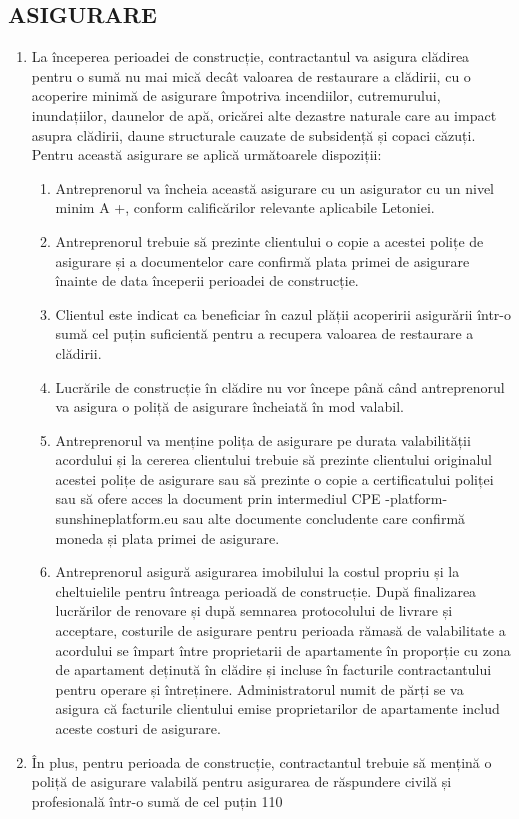 \begin{multicols}{2}
\subsection{ASIGURARE}
\begin{enumerate}
\item La începerea perioadei de construcție, contractantul va asigura clădirea pentru o sumă nu mai mică decât valoarea de restaurare a clădirii, cu o acoperire minimă de asigurare împotriva incendiilor, cutremurului, inundațiilor, daunelor de apă, oricărei alte dezastre naturale care au impact asupra clădirii, daune structurale cauzate de subsidență și copaci căzuți. Pentru această asigurare se aplică următoarele dispoziții:
  \begin{enumerate}
\item Antreprenorul va încheia această asigurare cu un asigurator cu un nivel minim A +, conform calificărilor relevante aplicabile Letoniei.
\item Antreprenorul trebuie să prezinte clientului o copie a acestei polițe de asigurare și a documentelor care confirmă plata primei de asigurare înainte de data începerii perioadei de construcție.
\item Clientul este indicat ca beneficiar în cazul plății acoperirii asigurării într-o sumă cel puțin suficientă pentru a recupera valoarea de restaurare a clădirii.
\item Lucrările de construcție în clădire nu vor începe până când antreprenorul va asigura o poliță de asigurare încheiată în mod valabil.
\item Antreprenorul va menține polița de asigurare pe durata valabilității acordului și la cererea clientului trebuie să prezinte clientului originalul acestei polițe de asigurare sau să prezinte o copie a certificatului poliței sau să ofere acces la document prin intermediul CPE -platform-sunshineplatform.eu sau alte documente concludente care confirmă moneda și plata primei de asigurare.
\item Antreprenorul asigură asigurarea imobilului la costul propriu și la cheltuielile pentru întreaga perioadă de construcție. După finalizarea lucrărilor de renovare și după semnarea protocolului de livrare și acceptare, costurile de asigurare pentru perioada rămasă de valabilitate a acordului se împart între proprietarii de apartamente în proporție cu zona de apartament deținută în clădire și incluse în facturile contractantului pentru operare și întreținere. Administratorul numit de părți se va asigura că facturile clientului emise proprietarilor de apartamente includ aceste costuri de asigurare.
\end{enumerate}
\item În plus, pentru perioada de construcție, contractantul trebuie să mențină o poliță de asigurare valabilă pentru asigurarea de răspundere civilă și profesională într-o sumă de cel puțin 110%
  \end{enumerate}



\end{multicols}
